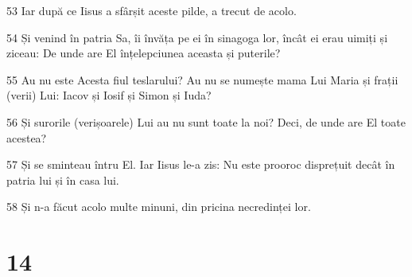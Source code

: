 \par 53 Iar după ce Iisus a sfârșit aceste pilde, a trecut de acolo.
\par 54 Și venind în patria Sa, îi învăța pe ei în sinagoga lor, încât ei erau uimiți și ziceau: De unde are El înțelepciunea aceasta și puterile?
\par 55 Au nu este Acesta fiul teslarului? Au nu se numește mama Lui Maria și frații (verii) Lui: Iacov și Iosif și Simon și Iuda?
\par 56 Și surorile (verișoarele) Lui au nu sunt toate la noi? Deci, de unde are El toate acestea?
\par 57 Și se sminteau întru El. Iar Iisus le-a zis: Nu este prooroc disprețuit decât în patria lui și în casa lui.
\par 58 Și n-a făcut acolo multe minuni, din pricina necredinței lor.

\chapter{14}

